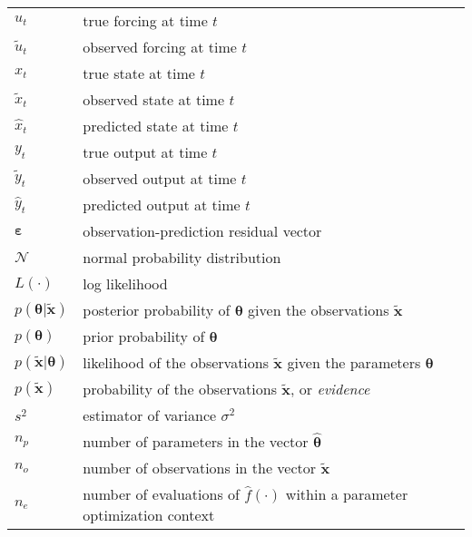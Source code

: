 \begin{center}
\begin{longtable}{lp{10cm}}
$u_t$&true forcing at time $t$\\
$\tilde{u}_t$&observed forcing at time $t$\\
$x_t$&true state at time $t$\\
$\tilde{x}_t$&observed state at time $t$\\
$\hat{x}_t$&predicted state at time $t$\\
$y_t$&true output at time $t$\\
$\tilde{y}_t$&observed output at time $t$\\
$\hat{y}_t$&predicted output at time $t$\\
$\boldsymbol\varepsilon$&observation-prediction residual vector\\
$\mathcal{N}$&normal probability distribution\\
$L(\cdot{})$&log likelihood\\
$p(\boldsymbol\theta|\tilde{\mathbf{x}})$&posterior probability of $\boldsymbol{\theta}$ given the observations $\tilde{\mathbf{x}}$\\
$p(\boldsymbol\theta)$&prior probability of $\boldsymbol{\theta}$\\
$p(\tilde{\mathbf{x}}|\boldsymbol\theta)$&likelihood of the observations $\tilde{\mathbf{x}}$ given the parameters $\boldsymbol{\theta}$\\
$p(\tilde{\mathbf{x}})$&probability of the observations $\tilde{\mathbf{x}}$, or \textit{evidence}\\
$s^2$&estimator of variance $\sigma^2$\\
$n_p$&number of parameters in the vector $\hat{\boldsymbol{\theta}}$\\
$n_o$&number of observations in the vector $\tilde{\mathbf{x}}$\\
$n_e$&number of evaluations of $\hat{f}(\cdot{})$ within a parameter optimization context\\
\end{longtable}
\end{center}
